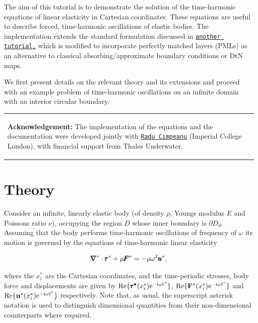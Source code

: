 The aim of this tutorial is to demonstrate the solution of the time-\/harmonic equations of linear elasticity in Cartesian coordinates. These equations are useful to describe forced, time-\/harmonic oscillations of elastic bodies. The implementation extends the standard formulation discussed in \href{../../time_harmonic_linear_elasticity/elastic_annulus/html/index.html}{\tt another tutorial,} which is modified to incorporate perfectly matched layers (P\+M\+Ls) as an alternative to classical absorbing/approximate boundary conditions or DtN maps.

We first present details on the relevant theory and its extensions and proceed with an example problem of time-\/harmonic oscillations on an infinite domain with an interior circular boundary.

\begin{center} \tabulinesep=1mm
\begin{longtabu} spread 0pt [c]{*{1}{|X[-1]}|}
\hline
\begin{center} {\bfseries Acknowledgement\+:} The implementation of the equations and the documentation were developed jointly with \href{http://imperial.academia.edu/RaduCimpeanu}{\tt Radu Cimpeanu} (Imperial College London), with financial support from Thales Underwater. \end{center}    \\
\end{longtabu}
\end{center} 



 

\hypertarget{index_theory}{}\section{Theory}\label{index_theory}
Consider an infinite, linearly elastic body (of density $ \rho $, Young\textquotesingle{}s modulus $ E $ and Poisson\textquotesingle{}s ratio $ \nu $), occupying the region $ D $ whose inner boundary is $ \partial D_d $. Assuming that the body performs time-\/harmonic oscillations of frequency of $ \omega $ its motion is governed by the equations of time-\/harmonic linear elasticity \begin{center} \[ {\pmb{\nabla}^*}\cdot\pmb{\tau}^*+ \rho \pmb{F}^*={\rm -\rho\omega^2}\pmb{u}^*, \] \end{center}  where the $ x_{i}^* $ are the Cartesian coordinates, and the time-\/periodic stresses, body force and displacements are given by $ {\rm Re}\{\pmb{\tau^*}(x_{i}^*){\rm e}^{-{\rm i}\omega t^*}\} $, $ {\rm Re}\{\mathbf{F}^*(x_{i}^*){\rm e}^{-{\rm i}\omega t^*}\} $ and $ {\rm Re}\{\mathbf{u}^*(x_{i}^*){\rm e}^{-{\rm i}\omega t^*}\} $ respectively. Note that, as usual, the superscript asterisk notation is used to distinguish dimensional quantities from their non-\/dimensional counterparts where required.

